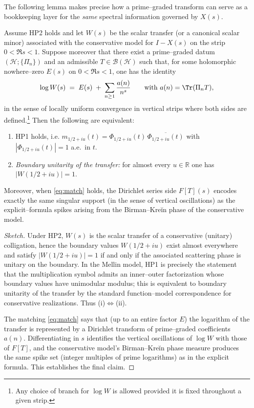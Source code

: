 The following lemma makes precise how a prime–graded transform can serve as a bookkeeping layer for the \emph{same} spectral information governed by $X(s)$.

\begin{lemma}\label{lem:bridge}
Assume HP2 holds and let $W(s)$ be the scalar transfer (or a canonical scalar minor) associated with the conservative model for $I-X(s)$ on the strip $0<\Re s<1$. Suppose moreover that there exist a prime–graded datum $(\mathcal H;\{\Pi_n\})$ and an admissible $T\in\mathcal B(\mathcal H)$ such that, for some holomorphic nowhere–zero $E(s)$ on $0<\Re s<1$, one has the identity
\begin{equation}\label{eq:match}
\log W(s)\;=\;E(s)\;+\;\sum_{n\ge1}\frac{a(n)}{n^{s}}\qquad\text{with }a(n)=\Tr(\Pi_n T),
\end{equation}
in the sense of locally uniform convergence in vertical strips where both sides are defined.\footnote{Any choice of branch for $\log W$ is allowed provided it is fixed throughout a given strip.}
Then the following are equivalent:
\begin{enumerate}
\item[\emph{(i)}] \textup{HP1} holds, i.e. $m_{1/2+iu}(t)=\Phi_{1/2+iu}(t)\,\overline{\Phi_{1/2+iu}(t)}$ with $|\Phi_{1/2+iu}(t)|=1$ a.e.\ in $t$.
\item[\emph{(ii)}] \emph{Boundary unitarity of the transfer:} for almost every $u\in\mathbb R$ one has $|W(1/2+iu)|=1$.
\end{enumerate}
Moreover, when \eqref{eq:match} holds, the Dirichlet series side $F[T](s)$ encodes exactly the same singular support (in the sense of vertical oscillations) as the explicit–formula spikes arising from the Birman–Kreĭn phase of the conservative model.
\end{lemma}

\begin{proof}[Sketch]
Under HP2, $W(s)$ is the scalar transfer of a conservative (unitary) colligation, hence the boundary values $W(1/2+iu)$ exist almost everywhere and satisfy $|W(1/2+iu)|=1$ if and only if the associated scattering phase is unitary on the boundary. In the Mellin model, HP1 is precisely the statement that the multiplication symbol admits an inner–outer factorization whose boundary values have unimodular modulus; this is equivalent to boundary unitarity of the transfer by the standard function–model correspondence for conservative realizations. Thus (i)$\Leftrightarrow$(ii).

The matching \eqref{eq:match} says that (up to an entire factor $E$) the logarithm of the transfer is represented by a Dirichlet transform of prime–graded coefficients $a(n)$. Differentiating in $s$ identifies the vertical oscillations of $\log W$ with those of $F[T]$, and the conservative model’s Birman–Kreĭn phase measure produces the same spike set (integer multiples of prime logarithms) as in the explicit formula. This establishes the final claim.
\end{proof}

